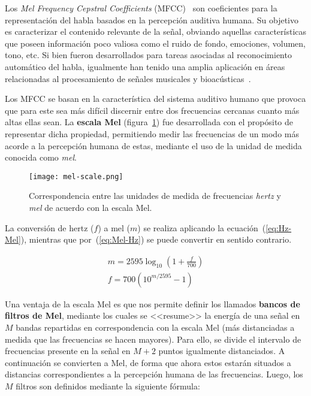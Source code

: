 Los \textit{Mel Frequency Cepstral Coefficients} (MFCC)~\cite{Davis80} son coeficientes para la representación del habla basados en la percepción auditiva humana.
Su objetivo es caracterizar el contenido relevante de la señal, obviando aquellas características que poseen información poco valiosa como el ruido de fondo, emociones, volumen, tono, etc.
Si bien fueron desarrollados para tareas asociadas al reconocimiento automático del habla, igualmente han tenido una amplia aplicación en áreas relacionadas al procesamiento de señales musicales y bioacústicas~\cite{Clemins05,Cowling03,Dufour14,Fagerlund07,Lee06,Li01,McKinney03,Mitrovic06}.

Los MFCC se basan en la característica del sistema auditivo humano que provoca que para este sea más difícil discernir entre dos frecuencias cercanas cuanto más altas ellas sean.
La \textbf{escala Mel} (figura~\ref{img:mel-scale}) fue desarrollada con el propósito de representar dicha propiedad, permitiendo medir las frecuencias de un modo más acorde a la percepción humana de estas, mediante el uso de la unidad de medida conocida como \textit{mel}.

\begin{figure}[!h]
    \centering
    \texttt{[image: mel-scale.png]}
    \caption{Correspondencia entre las unidades de medida de frecuencias \textit{hertz} y \textit{mel} de acuerdo con la escala Mel.}
    \label{img:mel-scale}
\end{figure}

La conversión de hertz ($f$) a mel ($m$) se realiza aplicando la ecuación~(\ref{eq:Hz-Mel}), mientras que por~(\ref{eq:Mel-Hz}) se puede convertir en sentido contrario.

\begin{gather}
    \label{eq:Hz-Mel}
    m = 2595\log_{10}\left( 1 + \frac{f}{700} \right) \\
    \label{eq:Mel-Hz}
    f = 700\left( 10^{m/2595} - 1 \right)
\end{gather}

Una ventaja de la escala Mel es que nos permite definir los llamados \textbf{bancos de filtros de Mel}, mediante los cuales se <<resume>> la energía de una señal en $M$ bandas repartidas en correspondencia con la escala Mel (más distanciadas a medida que las frecuencias se hacen mayores).
Para ello, se divide el intervalo de frecuencias presente en la señal en $M+2$ puntos igualmente distanciados.
A continuación se convierten a Mel, de forma que ahora estos estarán situados a distancias correspondientes a la percepción humana de las frecuencias.
Luego, los $M$ filtros son definidos mediante la siguiente fórmula:

